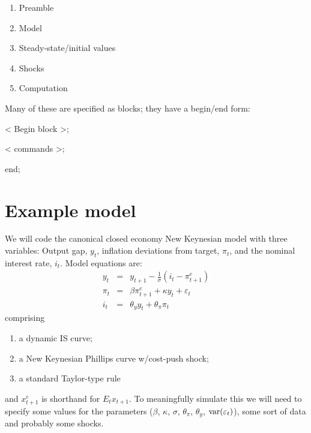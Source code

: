 \documentclass[
  letterpaper,
]{book}
\newenvironment{Shaded}{\begin{snugshade}}{\end{snugshade}}
\newcommand{\KeywordTok}[1]{\textcolor[rgb]{0.00,0.23,0.31}{#1}}
\newcommand{\OperatorTok}[1]{\textcolor[rgb]{0.37,0.37,0.37}{#1}}
\newcommand{\VariableTok}[1]{\textcolor[rgb]{0.07,0.07,0.07}{#1}}
\providecommand{\tightlist}{%
  \setlength{\itemsep}{0pt}\setlength{\parskip}{0pt}}\usepackage{longtable,booktabs,array}
\begin{document}
\begin{enumerate}
\def\labelenumi{\arabic{enumi}.}
\tightlist
\item
  Preamble
\item
  Model
\item
  Steady-state/initial values
\item
  Shocks
\item
  Computation
\end{enumerate}

Many of these are specified as blocks; they have a begin/end form:

\begin{Shaded}
\begin{Highlighting}[]
 \OperatorTok{\textless{}} \VariableTok{Begin} \VariableTok{block} \OperatorTok{\textgreater{};}

    \OperatorTok{\textless{}} \VariableTok{commands} \OperatorTok{\textgreater{};}

 \KeywordTok{end}\OperatorTok{;}
\end{Highlighting}
\end{Shaded}

\hypertarget{example-model}{%
\section{Example model}\label{example-model}}

We will code the canonical closed economy New Keynesian model with three
variables: Output gap, \(y_t\), inflation deviations from target,
\(\pi_t\), and the nominal interest rate, \(i_t\). Model equations are:
\begin{eqnarray}
y_t   &=& y_{t+1}-\frac{1}{\sigma} (i_t - \pi^e_{t+1}) \\
\pi_t &=& \beta \pi^e_{t+1}+\kappa y_t + \varepsilon_t \\
i_t   &=& \theta_y y_t + \theta_\pi \pi_t
\end{eqnarray} comprising

\begin{enumerate}
\def\labelenumi{\arabic{enumi}.}
\tightlist
\item
  a dynamic IS curve;
\item
  a New Keynesian Phillips curve w/cost-push shock;
\item
  a standard Taylor-type rule
\end{enumerate}

and \(x^e_{t+1}\) is shorthand for \(E_t x_{t+1}\). To meaningfully
simulate this we will need to specify some values for the parameters
(\(\beta\), \(\kappa\), \(\sigma\), \(\theta_\pi\), \(\theta_y\),
\(\hbox{var}(\varepsilon_t)\)), some sort of data and probably some
shocks.
\end{document}
